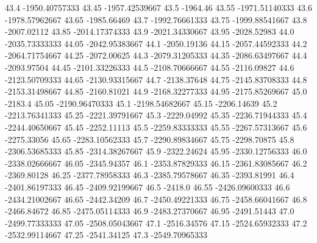            43.4   -1950.40757333
          43.45   -1957.42539667
           43.5         -1964.46
          43.55   -1971.51140333
           43.6   -1978.57962667
          43.65      -1985.66469
           43.7   -1992.76661333
          43.75   -1999.88541667
           43.8      -2007.02112
          43.85   -2014.17374333
           43.9   -2021.34330667
          43.95      -2028.52983
           44.0   -2035.73333333
          44.05   -2042.95383667
           44.1      -2050.19136
          44.15   -2057.44592333
           44.2   -2064.71754667
          44.25      -2072.00625
           44.3   -2079.31205333
          44.35   -2086.63497667
           44.4      -2093.97504
          44.45   -2101.33226333
           44.5   -2108.70666667
          44.55      -2116.09827
           44.6   -2123.50709333
          44.65   -2130.93315667
           44.7      -2138.37648
          44.75   -2145.83708333
           44.8   -2153.31498667
          44.85      -2160.81021
           44.9   -2168.32277333
          44.95   -2175.85269667
           45.0          -2183.4
          45.05   -2190.96470333
           45.1   -2198.54682667
          45.15      -2206.14639
           45.2   -2213.76341333
          45.25   -2221.39791667
           45.3      -2229.04992
          45.35   -2236.71944333
           45.4   -2244.40650667
          45.45      -2252.11113
           45.5   -2259.83333333
          45.55   -2267.57313667
           45.6      -2275.33056
          45.65   -2283.10562333
           45.7   -2290.89834667
          45.75      -2298.70875
           45.8   -2306.53685333
          45.85   -2314.38267667
           45.9      -2322.24624
          45.95   -2330.12756333
           46.0   -2338.02666667
          46.05      -2345.94357
           46.1   -2353.87829333
          46.15   -2361.83085667
           46.2      -2369.80128
          46.25   -2377.78958333
           46.3   -2385.79578667
          46.35      -2393.81991
           46.4   -2401.86197333
          46.45   -2409.92199667
           46.5          -2418.0
          46.55   -2426.09600333
           46.6   -2434.21002667
          46.65      -2442.34209
           46.7   -2450.49221333
          46.75   -2458.66041667
           46.8      -2466.84672
          46.85   -2475.05114333
           46.9   -2483.27370667
          46.95      -2491.51443
           47.0   -2499.77333333
          47.05   -2508.05043667
           47.1      -2516.34576
          47.15   -2524.65932333
           47.2   -2532.99114667
          47.25      -2541.34125
           47.3   -2549.70965333
